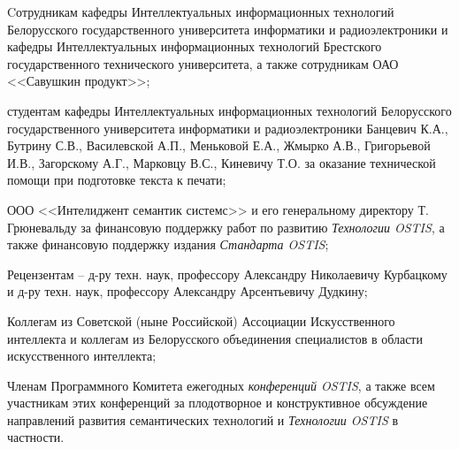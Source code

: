 \begin{SCn}
{\begin{scnitemize}
	\item Cотрудникам кафедры Интеллектуальных информационных технологий Белорусского государственного университета информатики и радиоэлектроники и кафедры Интеллектуальных информационных технологий Брестского государственного технического университета, а также сотрудникам ОАО <<Савушкин продукт>>;
	\item студентам кафедры Интеллектуальных информационных технологий Белорусского государственного университета информатики и радиоэлектроники Банцевич К.А., Бутрину С.В., Василевской А.П., Меньковой Е.А., Жмырко А.В., Григорьевой И.В., Загорскому А.Г., Марковцу В.С., Киневичу Т.О. за оказание технической помощи при подготовке текста к печати;
	\item ООО <<Интелиджент семантик системс>> и его генеральному директору Т. Грюневальду за финансовую поддержку работ по развитию \textit{Технологии OSTIS}, а также финансовую поддержку издания \textit{Стандарта OSTIS};
	\item Рецензентам -- д-ру техн. наук, профессору Александру Николаевичу Курбацкому и д-ру техн. наук, профессору Александру Арсентьевичу Дудкину;
	\item Коллегам из Советской (ныне Российской) Ассоциации Искусственного интеллекта и коллегам из Белорусского объединения специалистов в области искусственного интеллекта;
	\item Членам Программного Комитета ежегодных \textit{конференций OSTIS}, а также всем участникам этих конференций за плодотворное и конструктивное обсуждение направлений развития семантических технологий и \textit{Технологии OSTIS} в частности.
\end{scnitemize}}

\newpage

\end{SCn}